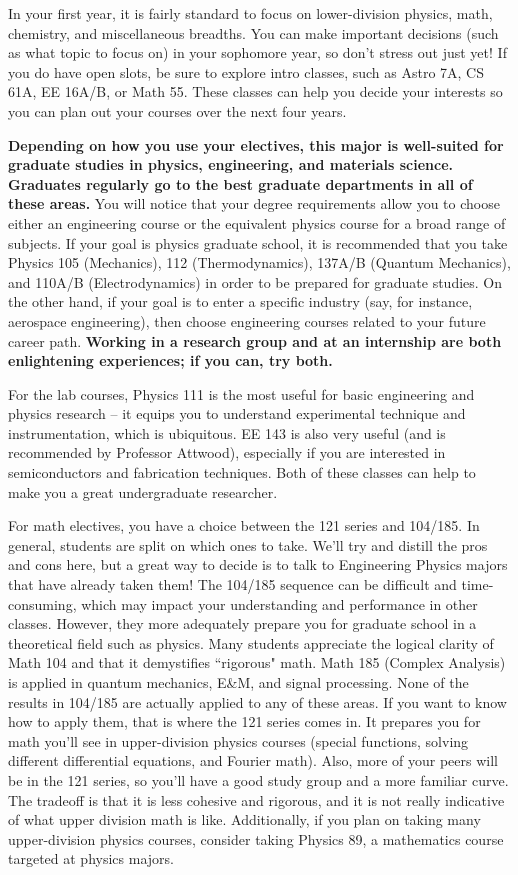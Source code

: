 In your first year, it is fairly standard to focus on lower-division physics, math, chemistry, and miscellaneous breadths. You can make important decisions (such as what topic to focus on) in your sophomore year, so don't stress out just yet! If you do have open slots, be sure to explore intro classes, such as Astro 7A, CS 61A, EE 16A/B, or Math 55. These classes can help you decide your interests so you can plan out your courses over the next four years.

\textbf{Depending on how you use your electives, this major is well-suited for graduate studies in physics, engineering, and materials science. Graduates regularly go to the best graduate departments in all of these areas.} You will notice that your degree requirements allow you to choose either an engineering course or the equivalent physics course for a broad range of subjects. If your goal is physics graduate school, it is recommended that you take Physics 105 (Mechanics), 112 (Thermodynamics), 137A/B (Quantum Mechanics), and 110A/B (Electrodynamics) in order to be prepared for graduate studies. On the other hand, if your goal is to enter a specific industry (say, for instance, aerospace engineering), then choose engineering courses related to your future career path. \textbf{Working in a research group and at an internship are both enlightening experiences; if you can, try both.}

For the lab courses, Physics 111 is the most useful for basic engineering and physics research – it equips you to understand experimental technique and instrumentation, which is ubiquitous. EE 143 is also very useful (and is recommended by Professor Attwood), especially if you are interested in semiconductors and fabrication techniques. Both of these classes can help to make you a great undergraduate researcher.

For math electives, you have a choice between the 121 series and 104/185. In general, students are split on which ones to take. We'll try and distill the pros and cons here, but a great way to decide is to talk to Engineering Physics majors that have already taken them! The 104/185 sequence can be difficult and time-consuming, which may impact your understanding and performance in other classes. However, they more adequately prepare you for graduate school in a theoretical field such as physics. Many students appreciate the logical clarity of Math 104 and that it demystifies ``rigorous" math. Math 185 (Complex Analysis) is applied in quantum mechanics, E\&M, and signal processing. None of the results in 104/185 are actually applied to any of these areas. If you want to know how to apply them, that is where the 121 series comes in.  It prepares you for math you’ll see in upper-division physics courses (special functions, solving different differential equations, and Fourier math). Also, more of your peers will be in the 121 series, so you’ll have a good study group and a more familiar curve. The tradeoff is that it is less cohesive and rigorous, and it is not really indicative of what upper division math is like. Additionally, if you plan on taking many upper-division physics courses, consider taking Physics 89, a mathematics course targeted at physics majors.

